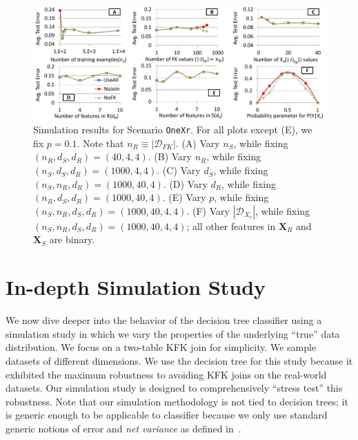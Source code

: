 \documentclass{vldb}
\begin{document}
\begin{figure}[t]
\centering
\includegraphics[width=0.92\linewidth]{onexr.pdf}
\vspace{2mm}
\caption{Simulation results for Scenario \texttt{OneXr}. For all plots except (E), we fix $p = 0.1$. Note that $n_R \equiv |\mathcal{D}_{FK}|$.
(A) Vary $n_S$, while fixing $(n_R, d_S, d_R) = (40, 4, 4)$.
(B) Vary $n_R$, while fixing $(n_S, d_S, d_R) = (1000, 4, 4)$.
(C) Vary $d_S$, while fixing $(n_S, n_R, d_R) = (1000, 40, 4)$.
(D) Vary $d_R$, while fixing $(n_R, d_S, d_R) = (1000, 40, 4)$.
(E) Vary $p$,  while fixing $(n_S, n_R, d_S, d_R) = (1000, 40, 4, 4)$.
(F) Vary $|\mathcal{D}_{X_r}|$, while fixing $(n_S, n_R, d_S, d_R) = (1000, 40, 4, 4)$; all other features in $\textbf{X}_R$ and $\textbf{X}_S$ are binary.
}
\label{Figure:OneXrSimulation}
\end{figure}

\section{In-depth Simulation Study}	

We now dive deeper into the behavior of the decision tree classifier using a simulation study in which we vary the properties of the 
underlying ``true'' data distribution. We focus on a two-table KFK join for simplicity. We sample datasets of different dimensions.
We use the decision tree for this study because it exhibited the maximum robustness to avoiding KFK joins on the real-world datasets.
Our simulation study is designed to comprehensively ``stress test'' this robustness.
Note that our simulation methodology is not tied to decision trees; it is generic enough to be applicable to classifier because we only 
use standard generic notions of error and \textit{net variance} as defined in~\cite{hamlet}.
\end{document}
